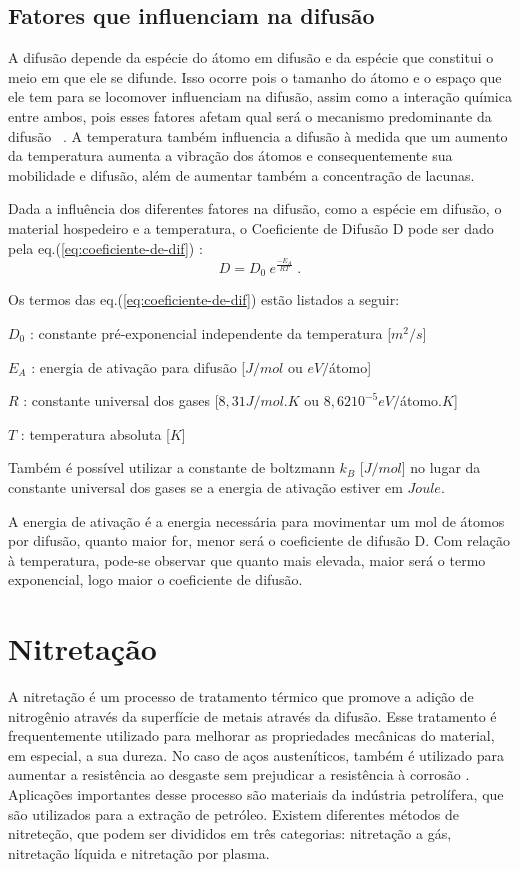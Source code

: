 \documentclass[]{politex}
\begin{document}
\subsection{Fatores que influenciam na difusão}
	A difusão depende da espécie do átomo em difusão e da espécie que constitui o meio em que ele se difunde. Isso ocorre pois o tamanho do átomo e o espaço que ele tem para se locomover influenciam na difusão, assim como a interação química entre ambos, pois esses fatores afetam qual será o mecanismo predominante da difusão ~\cite{callister2007materials}. A temperatura também influencia a difusão à medida que um aumento da temperatura aumenta a vibração dos átomos e consequentemente sua mobilidade e difusão, além de aumentar também a concentração de lacunas. 
	
	Dada a influência dos diferentes fatores na difusão, como a espécie em difusão, o material hospedeiro e a temperatura, o Coeficiente de Difusão D pode ser dado pela eq.(\ref{eq:coeficiente-de-dif}) \cite{callister2007materials}:
\begin{equation} \label{eq:coeficiente-de-dif}
	D = D_0 \ {e^{\frac{-E_A}{RT}}}		\;.
\end{equation}

Os termos das eq.(\ref{eq:coeficiente-de-dif}) estão listados a seguir:

$D_0$ : constante pré-exponencial independente da temperatura [$m^2/s$]

$E_A$ : energia de ativação para difusão [$J/mol$ ou $eV/$átomo]

$R$ : constante universal dos gases [$8,31 J/mol.K$ ou $8,62 10^{-5} eV/$átomo$.K$]

$T$ : temperatura absoluta [$K$]

Também é possível utilizar a constante de boltzmann $k_B$ [$J/mol$] no lugar da constante universal dos gases se a energia de ativação estiver em $Joule$.

A energia de ativação é a energia necessária para movimentar um mol de átomos por difusão, quanto maior for, menor será o coeficiente de difusão D. Com relação à temperatura, pode-se observar que quanto mais elevada, maior será o termo exponencial, logo maior o coeficiente de difusão.

\section{Nitretação}
	A nitretação é um processo de tratamento térmico que promove a adição de nitrogênio através da superfície de metais através da difusão. Esse tratamento é frequentemente utilizado para melhorar as propriedades mecânicas do material, em especial, a sua dureza. No caso de aços austeníticos, também é utilizado para aumentar a resistência ao desgaste sem prejudicar a resistência à corrosão \cite{baranowska2010importance}.
	 Aplicações importantes desse processo são materiais da indústria petrolífera, que são utilizados para a extração de petróleo.
	 Existem diferentes métodos de nitreteção, que podem ser divididos em três categorias: nitretação a gás,  nitretação líquida e nitretação por plasma.
	 
\end{document}
